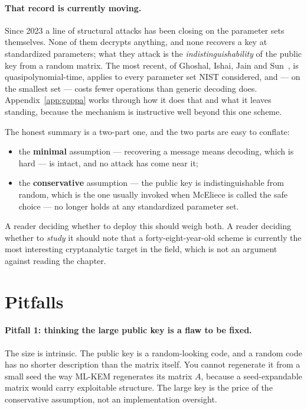 \paragraph{That record is currently moving.}
Since 2023 a line of structural attacks has been closing on the parameter sets themselves. None of them decrypts anything, and none recovers a key at standardized parameters; what they attack is the \emph{indistinguishability} of the public key from a random matrix. The most recent, of Ghoshal, Ishai, Jain and Sun~\cite{gijs2026}, is quasipolynomial-time, applies to every parameter set NIST considered, and --- on the smallest set --- costs fewer operations than generic decoding does. Appendix~\ref{app:goppa} works through how it does that and what it leaves standing, because the mechanism is instructive well beyond this one scheme.

The honest summary is a two-part one, and the two parts are easy to conflate:

\begin{itemize}
  \item the \textbf{minimal} assumption --- recovering a message means decoding, which is hard --- is intact, and no attack has come near it;
  \item the \textbf{conservative} assumption --- the public key is indistinguishable from random, which is the one usually invoked when McEliece is called the safe choice --- no longer holds at any standardized parameter set.
\end{itemize}

A reader deciding whether to deploy this should weigh both. A reader deciding whether to \emph{study} it should note that a forty-eight-year-old scheme is currently the most interesting cryptanalytic target in the field, which is not an argument against reading the chapter.

\section{Pitfalls}

\paragraph{Pitfall 1: thinking the large public key is a flaw to be fixed.}
The size is intrinsic. The public key is a random-looking code, and a random code has no shorter description than the matrix itself. You cannot regenerate it from a small seed the way ML-KEM regenerates its matrix $A$, because a seed-expandable matrix would carry exploitable structure. The large key is the price of the conservative assumption, not an implementation oversight.


